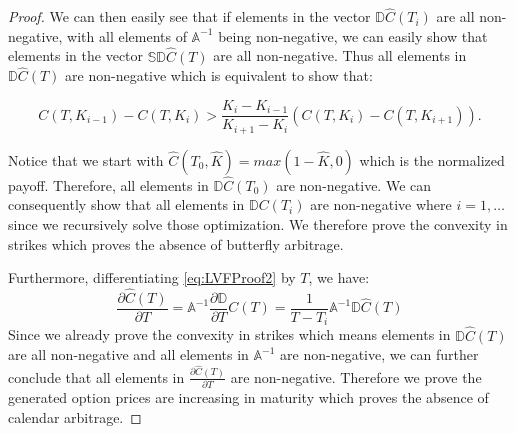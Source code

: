 \documentclass[letterpaper,12pt,titlepage,oneside,final]{book}
\numberwithin{equation}{section}
\theoremstyle{definition}
\begin{document}
\begin{proof}
		We can then easily see that 
		if elements in the vector $\mathcal{\mathbb{D}}\widehat{C}(T_i)$ are all non-negative, with all elements of $\mathcal{\mathbb{A}}^{-1}$ being non-negative, we can easily show that elements in the vector $\mathcal{\mathbb{S}}\mathcal{\mathbb{D}}\widehat{C}(T)$ are all non-negative. Thus all elements in $\mathcal{\mathbb{D}}\widehat{C}(T)$ are non-negative which is equivalent to show that:

		\[
				C(T,K_{i-1})-C(T,K_{i}) > \frac{K_i-K_{i-1}}{K_{i+1}-K_{i}}\left( C(T,K_{i})-C(T,K_{i+1})  \right).
		\]

		Notice that we start with $\widehat{C}(T_0,\widehat{K})=max(1-\widehat{K},0)$ which is the normalized payoff. Therefore, all elements in $\mathcal{\mathbb{D}}\widehat{C}(T_0)$ are non-negative. We can consequently show that all elements in $\mathcal{\mathbb{D}}C(T_i)$ are non-negative where $i=1,\dots$ since we recursively solve those optimization.  We therefore prove the convexity in strikes which proves the absence of butterfly arbitrage.

		Furthermore, differentiating \eqref{eq:LVFProof2} by $T$, we have:
		\begin{equation}
			\frac{\partial \widehat{C}(T)}{ \partial T} =\mathcal{\mathbb{A}}^{-1}  \frac{\partial \mathcal{\mathbb{D}}}{\partial T} C(T)=\frac{1}{T-T_i}\mathcal{\mathbb{A}}^{-1}  \mathcal{\mathbb{D}} \widehat{C}(T) 
			\label{eq:LVFProof3}
		\end{equation}
		Since we already prove the convexity in strikes which means elements in $\mathcal{\mathbb{D}} \widehat{C}(T)$ are all non-negative and all elements in $\mathcal{\mathbb{A}}^{-1}$ are non-negative, we can further conclude that all elements in  $\frac{\partial \widehat{C}(T)}{ \partial T}$ are non-negative. Therefore we prove the generated option prices are increasing in maturity which proves the absence of calendar arbitrage.

\end{proof}
\end{document}
